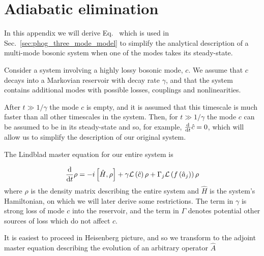 %
%
%


\chapter{Adiabatic elimination}\label{appendix:adiabatic_elimination}

In this appendix we will derive Eq.~ which is used in Sec.~\ref{sec:phog_three_mode_model} to simplify the analytical description of a multi-mode bosonic system when one of the modes takes its steady-state. 

Consider a system involving a highly lossy bosonic mode, $c$. We assume that $c$ decays into a Markovian reservoir with decay rate $\gamma$, and that the system contains additional modes with possible losses, couplings and nonlinearities. 

After $t \gg 1/\gamma$ the mode $c$ is empty, and it is assumed that this timescale is much faster than all other timescales in the system. Then, for $t \gg 1/\gamma$ the mode $c$ can be assumed to be in its steady-state and so, for example, $\frac{\mathrm{d}}{\mathrm{d}t} \hat{c} = 0$, which will allow us to simplify the description of our original system.

The Lindblad master equation for our entire system is

\begin{equation}
\frac{\mathrm{d}}{\mathrm{d}t} \rho = - i \left[ \hat{H}, \rho \right] + \gamma \mathcal{L}\left(\hat{c}\right) \rho + \Gamma_j\mathcal{L}\left(f\left(\hat{a}_j\right)\right) \rho
\end{equation}
where $\rho$ is the density matrix describing the entire system and $\hat{H}$ is the system's Hamiltonian, on which we will later derive some restrictions. The term in $\gamma$ is strong loss of mode $c$ into the reservoir, and the term in $\Gamma$ denotes potential other sources of loss which do not affect $c$.

It is easiest to proceed in Heisenberg picture, and so we transform to the adjoint master equation \cite{Breuer2002} describing the evolution of an arbitrary operator $\hat{A}$

